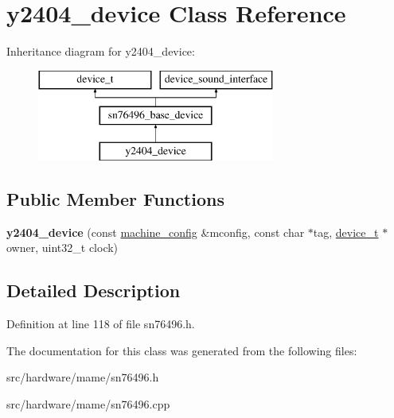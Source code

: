 \hypertarget{classy2404__device}{\section{y2404\-\_\-device Class Reference}
\label{classy2404__device}
}
Inheritance diagram for y2404\-\_\-device\-:\begin{figure}[H]
\begin{center}
\leavevmode
\includegraphics[height=3.000000cm]{classy2404__device}
\end{center}
\end{figure}
\subsection*{Public Member Functions}
\begin{DoxyCompactItemize}
\item 
\hypertarget{classy2404__device_aede28d65bdd93c93806cb3ea99222352}{{\bfseries y2404\-\_\-device} (const \hyperlink{structmachine__config}{machine\-\_\-config} \&mconfig, const char $\ast$tag, \hyperlink{classdevice__t}{device\-\_\-t} $\ast$owner, uint32\-\_\-t clock)}\label{classy2404__device_aede28d65bdd93c93806cb3ea99222352}

\end{DoxyCompactItemize}


\subsection{Detailed Description}


Definition at line 118 of file sn76496.\-h.



The documentation for this class was generated from the following files\-:\begin{DoxyCompactItemize}
\item 
src/hardware/mame/sn76496.\-h\item 
src/hardware/mame/sn76496.\-cpp\end{DoxyCompactItemize}
